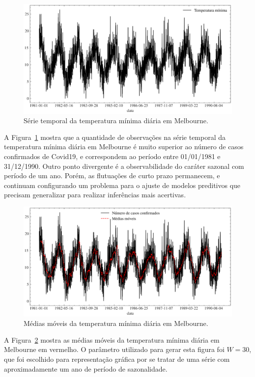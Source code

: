 \begin{figure}[!htp]
    \centering
    \includegraphics[width=5.0in]{img/temperatura_minima_diaria.pdf}
    \caption{Série temporal da temperatura mínima diária em Melbourne.}
    \label{fig:temperatura_minima_diaria}
\end{figure}

A Figura~\ref{fig:temperatura_minima_diaria} mostra que a quantidade de observações na série temporal da temperatura mínima diária em Melbourne é muito superior ao número de casos confirmados de Covid19, e correspondem ao período entre 01/01/1981 e 31/12/1990. Outro ponto divergente é a observabilidade do caráter sazonal com período de um ano. Porém, as flutuações de curto prazo permanecem, e continuam configurando um problema para o ajuste de modelos preditivos que precisam generalizar para realizar inferências mais acertivas.

\begin{figure}[!htp]
    \centering
    \includegraphics[width=5.0in]{img/temperatura_minima_diaria_ma.pdf}
    \caption{Médias móveis da temperatura mínima diária em Melbourne.}
    \label{fig:temperatura_minima_diaria_ma}
\end{figure}

A Figura~\ref{fig:temperatura_minima_diaria_ma} mostra as médias móveis da temperatura mínima diária em Melbourne em vermelho. O parâmetro utilizado para gerar esta figura foi $W=30$, que foi escolhido para representação gráfica por se tratar de uma série com aproximadamente um ano de período de sazonalidade.

